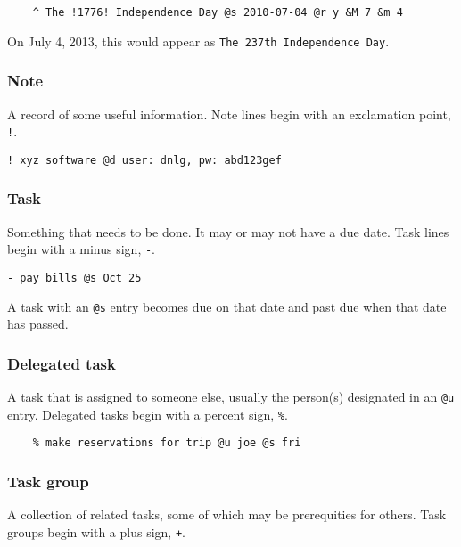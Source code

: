 \documentclass[]{article}
\begin{document}
\begin{verbatim}
    ^ The !1776! Independence Day @s 2010-07-04 @r y &M 7 &m 4
\end{verbatim}

On July 4, 2013, this would appear as
\texttt{The 237th Independence Day}.

\subsubsection{Note}

A record of some useful information. Note lines begin with an
exclamation point, \texttt{!}.

\begin{verbatim}
! xyz software @d user: dnlg, pw: abd123gef
\end{verbatim}

\subsubsection{Task}

Something that needs to be done. It may or may not have a due date. Task
lines begin with a minus sign, \texttt{-}.

\begin{verbatim}
- pay bills @s Oct 25
\end{verbatim}

A task with an \texttt{@s} entry becomes due on that date and past due
when that date has passed.

\subsubsection{Delegated task}

A task that is assigned to someone else, usually the person(s)
designated in an \texttt{@u} entry. Delegated tasks begin with a percent
sign, \texttt{\%}.

\begin{verbatim}
    % make reservations for trip @u joe @s fri
\end{verbatim}

\subsubsection{Task group}

A collection of related tasks, some of which may be prerequities for
others. Task groups begin with a plus sign, \texttt{+}.
\end{document}
